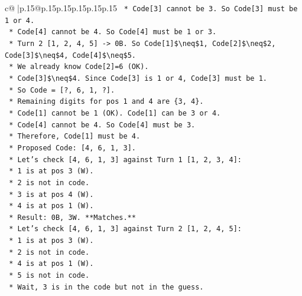 \documentclass{article}
\begin{document}
{\begin{supertabular}{c@{$\;$}|p{.15\linewidth}@{}p{.15\linewidth}p{.15\linewidth}p{.15\linewidth}p{.15\linewidth}p{.15\linewidth}}
{{{\texttt{                *   Code{[}3{]} cannot be 3. So Code{[}3{]} must be 1 or 4.} \\
\texttt{                *   Code{[}4{]} cannot be 4. So Code{[}4{]} must be 1 or 3.} \\
\texttt{            *   Turn 2 {[}1, 2, 4, 5{]} {-}> 0B. So Code{[}1{]}\$\textbackslash{}neq\$1, Code{[}2{]}\$\textbackslash{}neq\$2, Code{[}3{]}\$\textbackslash{}neq\$4, Code{[}4{]}\$\textbackslash{}neq\$5.} \\
\texttt{                *   We already know Code{[}2{]}=6 (OK).} \\
\texttt{                *   Code{[}3{]}\$\textbackslash{}neq\$4. Since Code{[}3{]} is 1 or 4, Code{[}3{]} must be 1.} \\
\texttt{                *   So Code = {[}?, 6, 1, ?{]}.} \\
\texttt{                *   Remaining digits for pos 1 and 4 are \{3, 4\}.} \\
\texttt{                *   Code{[}1{]} cannot be 1 (OK). Code{[}1{]} can be 3 or 4.} \\
\texttt{                *   Code{[}4{]} cannot be 4. So Code{[}4{]} must be 3.} \\
\texttt{                *   Therefore, Code{[}1{]} must be 4.} \\
\texttt{                *   Proposed Code: {[}4, 6, 1, 3{]}.} \\
\texttt{            *   Let's check {[}4, 6, 1, 3{]} against Turn 1 {[}1, 2, 3, 4{]}:} \\
\texttt{                *   1 is at pos 3 (W).} \\
\texttt{                *   2 is not in code.} \\
\texttt{                *   3 is at pos 4 (W).} \\
\texttt{                *   4 is at pos 1 (W).} \\
\texttt{                *   Result: 0B, 3W. **Matches.**} \\
\texttt{            *   Let's check {[}4, 6, 1, 3{]} against Turn 2 {[}1, 2, 4, 5{]}:} \\
\texttt{                *   1 is at pos 3 (W).} \\
\texttt{                *   2 is not in code.} \\
\texttt{                *   4 is at pos 1 (W).} \\
\texttt{                *   5 is not in code.} \\
\texttt{                *   Wait, 3 is in the code but not in the guess.} \\
}}}
\end{supertabular}}
\end{document}
